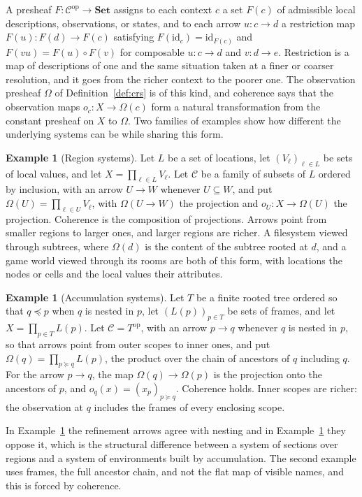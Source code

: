 \documentclass[11pt]{article}
\theoremstyle{definition}
\newtheorem{example}[theorem]{Example}
\theoremstyle{remark}
\newcommand{\cC}{\mathcal C}
\newcommand{\Set}{\mathbf{Set}}
\newcommand{\op}{\mathrm{op}}
\newcommand{\id}{\mathrm{id}}
\begin{document}
A presheaf $F:\cC^{\op}\to\Set$ assigns to each context $c$ a set $F(c)$ of admissible local descriptions, observations, or states, and to each arrow $u:c\to d$ a restriction map $F(u):F(d)\to F(c)$ satisfying $F(\id_c)=\id_{F(c)}$ and $F(vu)=F(u)\circ F(v)$ for composable $u:c\to d$ and $v:d\to e$. Restriction is a map of descriptions of one and the same situation taken at a finer or coarser resolution, and it goes from the richer context to the poorer one. The observation presheaf $\Omega$ of Definition~\ref{def:crs} is of this kind, and coherence says that the observation maps $o_c:X\to\Omega(c)$ form a natural transformation from the constant presheaf on $X$ to $\Omega$. Two families of examples show how different the underlying systems can be while sharing this form.

\begin{example}[Region systems]\label{ex:region}
Let $L$ be a set of locations, let $(V_\ell)_{\ell\in L}$ be sets of local values, and let $X=\prod_{\ell\in L}V_\ell$. Let $\cC$ be a family of subsets of $L$ ordered by inclusion, with an arrow $U\to W$ whenever $U\subseteq W$, and put $\Omega(U)=\prod_{\ell\in U}V_\ell$, with $\Omega(U\to W)$ the projection and $o_U:X\to\Omega(U)$ the projection. Coherence is the composition of projections. Arrows point from smaller regions to larger ones, and larger regions are richer. A filesystem viewed through subtrees, where $\Omega(d)$ is the content of the subtree rooted at $d$, and a game world viewed through its rooms are both of this form, with locations the nodes or cells and the local values their attributes.
\end{example}

\begin{example}[Accumulation systems]\label{ex:accum}
Let $T$ be a finite rooted tree ordered so that $q\preceq p$ when $q$ is nested in $p$, let $(L(p))_{p\in T}$ be sets of frames, and let $X=\prod_{p\in T}L(p)$. Let $\cC=T^{\op}$, with an arrow $p\to q$ whenever $q$ is nested in $p$, so that arrows point from outer scopes to inner ones, and put $\Omega(q)=\prod_{p\succeq q}L(p)$, the product over the chain of ancestors of $q$ including $q$. For the arrow $p\to q$, the map $\Omega(q)\to\Omega(p)$ is the projection onto the ancestors of $p$, and $o_q(x)=(x_p)_{p\succeq q}$. Coherence holds. Inner scopes are richer: the observation at $q$ includes the frames of every enclosing scope.
\end{example}

In Example~\ref{ex:region} the refinement arrows agree with nesting and in Example~\ref{ex:accum} they oppose it, which is the structural difference between a system of sections over regions and a system of environments built by accumulation. The second example uses frames, the full ancestor chain, and not the flat map of visible names, and this is forced by coherence.
\end{document}
